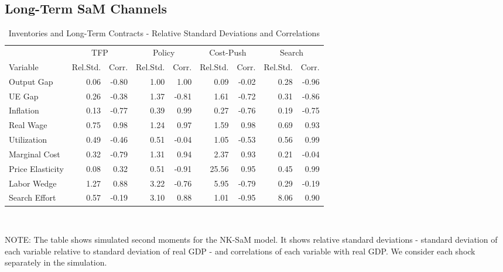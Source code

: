 \documentclass[12pt,3p,authoryear,review]{elsarticle}
\begin{document}
\subsection{Long-Term SaM Channels}\label{sec:robust_longterm_sam}%
\begin{table}[h!]%
	\begin{center}%
		\begin{footnotesize}%
			\caption{Inventories and Long-Term Contracts - Relative Standard Deviations and Correlations}\label{tab:app_robust_longterm_sam}%
			\begin{tabular}{l r r r r r r r r}%
				\hline%
				& \multicolumn{2}{c}{TFP} & \multicolumn{2}{c}{Policy} & \multicolumn{2}{c}{Cost-Push} & \multicolumn{2}{c}{Search}\\%
				Variable & Rel.Std. & Corr. & Rel.Std. & Corr. & Rel.Std. & Corr. & Rel.Std. & Corr.\\%
				\hline \hline%
				Output Gap & 0.06 & -0.80 & 1.00 & 1.00 & 0.09 & -0.02 & 0.28 & -0.96\\%
				UE Gap & 0.26 & -0.38 & 1.37 & -0.81 & 1.61 & -0.72 & 0.31 & -0.86\\%
				Inflation & 0.13 & -0.77 & 0.39 & 0.99 & 0.27 & -0.76 & 0.19 & -0.75\\%
				Real Wage & 0.75 & 0.98 & 1.24 & 0.97 & 1.59 & 0.98 & 0.69 & 0.93\\%
				Utilization & 0.49 & -0.46 & 0.51 & -0.04 & 1.05 & -0.53 & 0.56 & 0.99\\%
				Marginal Cost & 0.32 & -0.79 & 1.31 & 0.94 & 2.37 & 0.93 & 0.21 & -0.04\\%
				Price Elasticity & 0.08 & 0.32 & 0.51 & -0.91 & 25.56 & 0.95 & 0.45 & 0.99\\%
				Labor Wedge & 1.27 & 0.88 & 3.22 & -0.76 & 5.95 & -0.79 & 0.29 & -0.19\\%
				Search Effort & 0.57 & -0.19 & 3.10 & 0.88 & 1.01 & -0.95 & 8.06 & 0.90\\%
				\hline%
			\end{tabular}\\%
			\vspace{0.1in}%
			{\tiny NOTE: The table shows simulated second moments for the NK-SaM model. It shows relative standard deviations - standard deviation of each variable relative to standard deviation of real GDP - and correlations of each variable with real GDP. We consider each shock separately in the simulation.\par}%
		\end{footnotesize}%
	\end{center}%
\end{table}%
\end{document}
